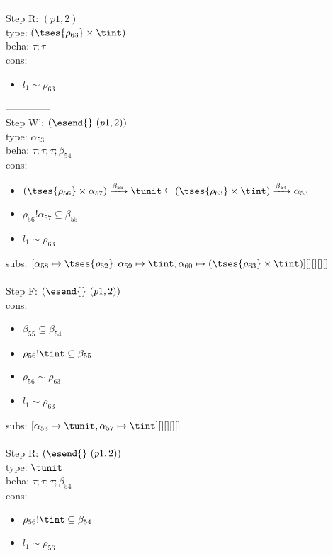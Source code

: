 \documentclass[12pt]{article}
\begin{document}
  \\--------------\\ 
Step R: $ (p1, 2) $\\
  type: $ ( \tses{ \rho_{63}} \times \tint) $ 
\\  beha: $ \tau; \tau $ 
\\  cons: \begin{itemize}
\item $ l_{1} \sim\rho_{63} $
\end{itemize} 
  --------------\\ 
Step W': $ (\esend{}~(p1, 2)) $\\
  type: $ \alpha_{53} $ 
\\  beha: $ \tau; \tau; \tau; \beta_{54} $ 
\\  cons: \begin{itemize}
\item $ ( \tses{ \rho_{56}} \times \alpha_{57}) \xrightarrow{\beta_{55}} \tunit \subseteq ( \tses{ \rho_{63}} \times \tint) \xrightarrow{\beta_{54}} \alpha_{53} $
\item $ \rho_{56}!\alpha_{57} \subseteq \beta_{55} $
\item $ l_{1} \sim\rho_{63} $
\end{itemize} 
  subs:  $ [ \alpha_{58}\mapsto \tses{ \rho_{62}}, \alpha_{59}\mapsto\tint, \alpha_{60}\mapsto( \tses{ \rho_{63}} \times \tint)] [] [] [] [] $  
 \\--------------\\ 
Step F: $ (\esend{}~(p1, 2)) $
 \\ cons: \begin{itemize}
\item $ \beta_{55} \subseteq \beta_{54} $
\item $ \rho_{56}!\tint \subseteq \beta_{55} $
\item $ \rho_{56} \sim\rho_{63} $
\item $ l_{1} \sim\rho_{63} $
\end{itemize}
 subs:  $ [ \alpha_{53}\mapsto\tunit, \alpha_{57}\mapsto\tint] [] [] [] [] $ 
  \\--------------\\ 
Step R: $ (\esend{}~(p1, 2)) $\\
  type: $ \tunit $ 
\\  beha: $ \tau; \tau; \tau; \beta_{54} $ 
\\  cons: \begin{itemize}
\item $ \rho_{56}!\tint \subseteq \beta_{54} $
\item $ l_{1} \sim\rho_{56} $
\end{itemize} 
\end{document}
